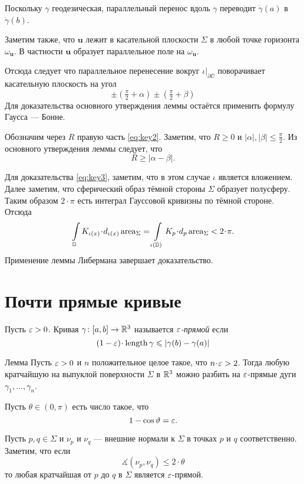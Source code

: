 \documentclass[a4paper,10pt]{article}
\begin{document}
Поскольку $\gamma$ геодезическая, 
параллельный перенос вдоль $\gamma$ 
переводит $\dot\gamma(a)$ в $\dot\gamma(b)$.

Заметим также, что $\bm{u}$ лежит в касательной плоскости $\Sigma$ в любой точке горизонта $\omega_{\bm{u}}$.
В частности $\bm{u}$ образует параллельное поле на $\omega_{\bm{u}}$.

Отсюда следует что параллельное перенесение вокруг $\iota|_{\partial\DD}$ 
поворачивает касательную плоскость на угол 
\[\pm(\tfrac\pi2+\alpha)\pm(\tfrac\pi2+\beta)\]
Для доказательства основного утверждения леммы остаётся применить формулу Гаусса --- Бонне.

Обозначим через $R$ правую часть \ref{eq:key2}.
Заметим, что $R\ge 0$ 
и $|\alpha|,|\beta|\le \tfrac\pi2$.
Из основного утверждения леммы следует, что  
\[R\ge\bigl|\alpha-\beta\bigr|.\]

Для доказательства \ref{eq:key3}, заметим, что в этом случае $\iota$ является вложением.
Далее заметим, что сферический образ тёмной стороны $\Sigma$ образует полусферу.
Таким образом $2\cdot\pi$ есть интеграл Гауссовой кривизны по тёмной стороне.
Отсюда
\[\int\limits_{\DD} K_{\iota(x)}\cdot d_{\iota(x)}\area_\Sigma
=
\int\limits_{\iota(\DD)} K_p\cdot d_p\area_\Sigma
<2\cdot\pi.\]
Применение леммы Либермана завершает доказательство.
\qeds

\section{Почти прямые кривые}

Пусть $\varepsilon>0$.
Кривая $\gamma\colon[a,b]\to\mathbb{R}^3$ называется \emph{$\varepsilon$-прямой}
если
\[(1-\eps)\cdot\length \gamma\le |\gamma(b)-\gamma(a)|\]

\begin{thm}{Лемма}\label{lem:eps-straight}
Пусть $\varepsilon>0$ 
и $n$ положительное целое такое, что 
$n\cdot\eps>2$.
Тогда любую кратчайшую на выпуклой поверхности $\Sigma$ в $\mathbb{R}^3$
можно разбить на $\varepsilon$-прямые дуги $\gamma_1,\dots,\gamma_n$.
\end{thm}

Пусть $\theta\in(0,\pi)$
есть число такое, что
\[1-\cos\vartheta=\varepsilon.\]

Пусть $p,q\in \Sigma$ и $\nu_p$ и $\nu_q$ --- внешние нормали к $\Sigma$ в точках $p$ и $q$ соответственно.
Заметим, что если 
\[\measuredangle(\nu_p,\nu_q)\le 2\cdot\theta\]
то любая кратчайшая от $p$ до $q$ в $\Sigma$
является $\varepsilon$-прямой.
\end{document}
